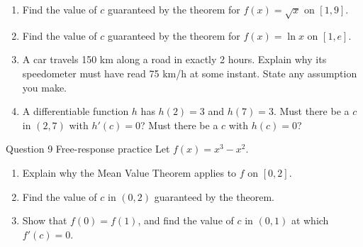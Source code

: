 \documentclass[11pt]{article}
\begin{document}
\begin{enumerate}[leftmargin=*,itemsep=2pt,start=5]
  \item Find the value of $c$ guaranteed by the theorem for $f(x)=\sqrt{x}$ on $[1,9]$.\work{2.8cm}
  \item Find the value of $c$ guaranteed by the theorem for $f(x)=\ln x$ on $[1,e]$.\work{2.8cm}
  \item A car travels 150 km along a road in exactly 2 hours. Explain why its speedometer must have read 75 km/h at some instant. State any assumption you make.\work{2.8cm}
  \item A differentiable function $h$ has $h(2)=3$ and $h(7)=3$. Must there be a $c$ in $(2,7)$ with $h'(c)=0$? Must there be a $c$ with $h(c)=0$?\work{2.8cm}
\end{enumerate}

\begin{frbox}{Question 9 \textperiodcentered{} Free-response practice}
Let $f(x)=x^3-x^2$.
\begin{enumerate}[label=(\alph*),leftmargin=*,itemsep=2pt]
  \item Explain why the Mean Value Theorem applies to $f$ on $[0,2]$.\work{2.6cm}
  \item Find the value of $c$ in $(0,2)$ guaranteed by the theorem.\work{2.6cm}
  \item Show that $f(0)=f(1)$, and find the value of $c$ in $(0,1)$ at which $f'(c)=0$.\work{2.6cm}
\end{enumerate}
\end{frbox}
\end{document}
